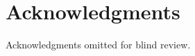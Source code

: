 \documentclass{sigchi}
\begin{document}








\section{Acknowledgments}
Acknowledgments omitted for blind review.

\balance

\end{document}
